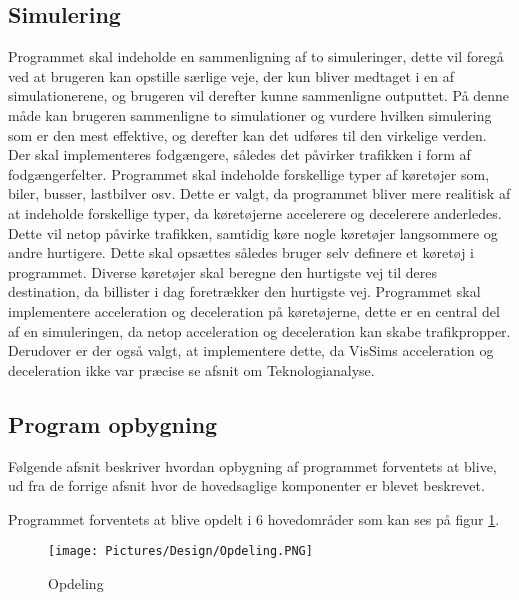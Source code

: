 \vspace{5mm}

\subsection*{Simulering}
Programmet skal indeholde en sammenligning af to simuleringer, dette vil foregå ved at brugeren kan opstille særlige veje, der kun bliver medtaget i en af simulationerene, og brugeren vil derefter kunne sammenligne outputtet. På denne måde kan brugeren sammenligne to simulationer og vurdere hvilken simulering som er den mest effektive, og derefter kan det udføres til den virkelige verden. Der skal implementeres fodgængere, således det påvirker trafikken i form af fodgængerfelter. Programmet skal indeholde forskellige typer af køretøjer som, biler, busser, lastbilver osv. Dette er valgt, da programmet bliver mere realitisk af at indeholde forskellige typer, da køretøjerne accelerere og decelerere anderledes. Dette vil netop påvirke trafikken, samtidig køre nogle køretøjer langsommere og andre hurtigere. Dette skal opsættes således bruger selv definere et køretøj i programmet.  Diverse køretøjer skal beregne den hurtigste vej til deres destination, da billister i dag foretrækker den hurtigste vej. Programmet skal implementere acceleration og deceleration på køretøjerne, dette er en central del af en simuleringen, da netop acceleration og deceleration kan skabe trafikpropper. Derudover er der også valgt, at implementere dette, da VisSims acceleration og deceleration ikke var præcise se afsnit om Teknologianalyse. 

\vspace{5mm}

\subsection*{Program opbygning}\label{ProgramOpbygning}
Følgende afsnit beskriver hvordan opbygning af programmet forventets at blive, ud fra de forrige afsnit hvor de hovedsaglige komponenter er blevet beskrevet.

Programmet forventets at blive opdelt i 6 hovedområder som kan ses på figur \ref{fig:ProgramOpdeling}. 

\begin{figure}[H]
\begin{adjustbox}{width=0.4\textwidth,center=\textwidth}
\centering
\texttt{[image: Pictures/Design/Opdeling.PNG]}
\end{adjustbox}
\caption{Opdeling}
\label{fig:ProgramOpdeling}
\end{figure}

